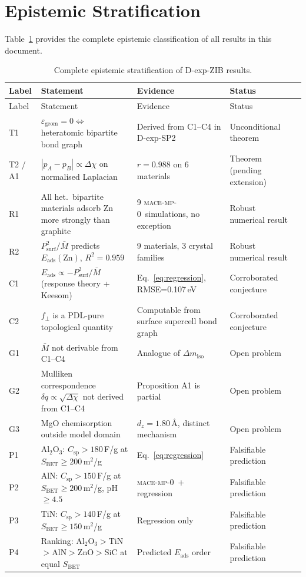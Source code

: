 \documentclass[11pt,a4paper]{article}
\newcommand{\Eads}{E_{\mathrm{ads}}}
\newcommand{\Psurf}{P_{\mathrm{surf}}}
\newcommand{\Mmoy}{\bar{M}}
\newcommand{\DeltaEN}{\Delta\chi}
\newcommand{\fracZ}{f_{\perp}}
\newcommand{\egeom}{\varepsilon_{\mathrm{geom}}}
\newcommand{\Csp}{C_{\mathrm{sp}}}
\newcommand{\SBET}{S_{\mathrm{BET}}}
\newcommand{\MACE}{\textsc{mace-mp-0}}
\begin{document}
\section{Epistemic Stratification}
\label{sec:epistemic}

Table~\ref{tab:epistemic} provides the complete epistemic classification of all results in this document.

\begin{longtable}{p{1.3cm} p{5.0cm} p{5.5cm} p{2.5cm}l}
\caption{Complete epistemic stratification of D-exp-ZIB results.}
\label{tab:epistemic}\\
\toprule
Label & Statement & Evidence & Status \\
\midrule
\endfirsthead
\toprule
Label & Statement & Evidence & Status \\
\midrule
\endhead
\bottomrule
\endfoot
T1 & $\egeom=0 \Leftrightarrow$ heteratomic bipartite bond graph & Derived from C1--C4 in D-exp-SP2 & Unconditional theorem \\[4pt]
T2 / A1 & $|p_A-p_B| \propto \DeltaEN$ on normalised Laplacian & $r=0.988$ on 6 materials & Theorem (pending extension) \\[4pt]
R1 & All het.\ bipartite materials adsorb Zn more strongly than graphite & 9 \MACE\ simulations, no exception & Robust numerical result \\[4pt]
R2 & $\Psurf^2/\Mmoy$ predicts $\Eads(\mathrm{Zn})$, $R^2=0.959$ & 9 materials, 3 crystal families & Robust numerical result \\[4pt]
C1 & $\Eads \propto -\Psurf^2/\Mmoy$ (response theory + Keesom) & Eq.~\eqref{eq:regression}, RMSE=0.107\,eV & Corroborated conjecture \\[4pt]
C2 & $\fracZ$ is a PDL-pure topological quantity & Computable from surface supercell bond graph & Corroborated conjecture \\[4pt]
G1 & $\Mmoy$ not derivable from C1--C4 & Analogue of $\Delta m_{\mathrm{iso}}$ & Open problem \\[4pt]
G2 & Mulliken correspondence $\delta q \propto \sqrt{\DeltaEN}$ not derived from C1--C4 & Proposition A1 is partial & Open problem \\[4pt]
G3 & MgO chemisorption outside model domain & $d_z=1.80$\,\AA, distinct mechanism & Open problem \\[4pt]
P1 & Al$_2$O$_3$: $\Csp>180$\,F/g at $\SBET\geq200$\,m$^2$/g & Eq.~\eqref{eq:regression} & Falsifiable prediction \\[4pt]
P2 & AlN: $\Csp>150$\,F/g at $\SBET\geq200$\,m$^2$/g, pH$\geq4.5$ & \MACE\ + regression & Falsifiable prediction \\[4pt]
P3 & TiN: $\Csp>140$\,F/g at $\SBET\geq150$\,m$^2$/g & Regression only & Falsifiable prediction \\[4pt]
P4 & Ranking: Al$_2$O$_3>$TiN$>$AlN$>$ZnO$>$SiC at equal $\SBET$ & Predicted $\Eads$ order & Falsifiable prediction \\[4pt]
\end{longtable}
\end{document}
